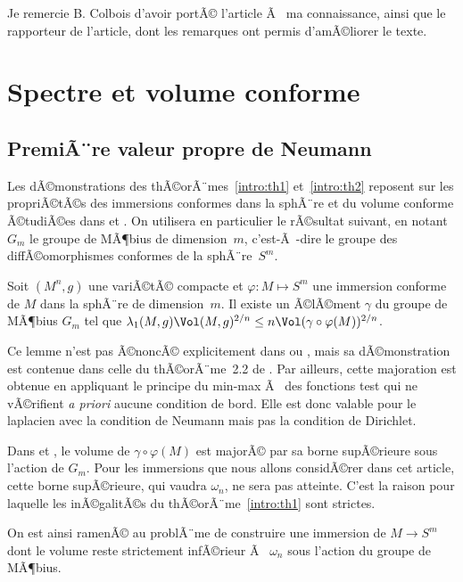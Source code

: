 \documentclass[11pt,a4paper]{smfart}
\begin{document}
Je remercie B. Colbois d'avoir portÃ© l'article \cite{kn10} Ã  ma connaissance,
ainsi que le rapporteur de l'article, dont les remarques ont permis d'amÃ©liorer
le texte.

\section{Spectre et volume conforme}\label{conforme}
\subsection{PremiÃ¨re valeur propre de Neumann}
Les dÃ©monstrations des thÃ©orÃ¨mes~\ref{intro:th1} et~\ref{intro:th2}
reposent sur les propriÃ©tÃ©s des immersions conformes dans la sphÃ¨re
et du volume conforme Ã©tudiÃ©es dans \cite{ly82} et \cite{esi86}.
On utilisera en particulier le rÃ©sultat suivant, en notant
$G_m$ le groupe de MÃ¶bius de dimension~$m$, c'est-Ã -dire
le groupe des diffÃ©omorphismes conformes de la sphÃ¨re~$S^m$. 
\begin{lemme}\label{conf:lemme}
Soit $(M^n,g)$ une variÃ©tÃ© compacte et $\varphi:M\mapsto S^m$ une immersion
conforme de $M$ dans la sphÃ¨re de dimension~$m$. Il existe un Ã©lÃ©ment $\gamma$
du groupe de MÃ¶bius $G_m$ tel que $\lambda_1(M,g)\Vol(M,g)^{2/n}\leq
n\Vol(\gamma\circ\varphi(M))^{2/n}$.
\end{lemme}
\begin{rema}\label{conf:rem1}
Ce lemme n'est pas Ã©noncÃ© explicitement dans \cite{ly82} ou \cite{esi86},
mais sa dÃ©monstration est contenue dans celle du thÃ©orÃ¨me~2.2 de \cite{esi86}.
Par ailleurs, cette majoration est obtenue en appliquant le principe
du min-max Ã  des fonctions test qui ne vÃ©rifient \emph{a priori} aucune
condition de bord. Elle est donc valable pour le laplacien avec 
la condition de Neumann mais pas la condition de Dirichlet.
\end{rema}
\begin{rema}\label{conf:rem2}
Dans \cite{ly82} et \cite{esi86}, le volume de $\gamma\circ\varphi(M)$
est majorÃ© par sa borne supÃ©rieure sous l'action de $G_m$. Pour les
immersions que nous allons considÃ©rer dans cet article, cette borne 
supÃ©rieure, qui vaudra $\omega_n$, ne sera pas atteinte. C'est la raison 
pour laquelle les inÃ©galitÃ©s du thÃ©orÃ¨me~\ref{intro:th1} sont strictes.
\end{rema}

On est ainsi ramenÃ© au problÃ¨me de construire une immersion de $M\to S^m$ 
dont le volume reste strictement infÃ©rieur Ã  $\omega_n$ sous l'action 
du groupe de MÃ¶bius.
\end{document}
